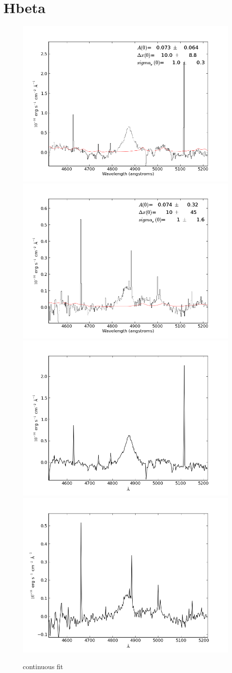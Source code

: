\documentclass[usenatbib]{mn2e}
\begin{document}
\newpage



\section{Hbeta}


\begin{figure}
\begin{center}
\includegraphics[width=0.46\linewidth,angle=0]{fe_fit_Hbeta_0.png}
\vspace{5mm}
\includegraphics[width=0.49\linewidth,angle=0]{fe_fit_Hbeta_1.png}\\
\includegraphics[width=0.46\linewidth,angle=0]{fe_fit_Hbeta_res_0.png}
\hspace{5mm}
\includegraphics[width=0.49\linewidth,angle=0]{fe_fit_Hbeta_res_1.png}\\
\end{center} 
\caption{continuous fit \label{fig:landscape}}   
\end{figure}
\end{document}
